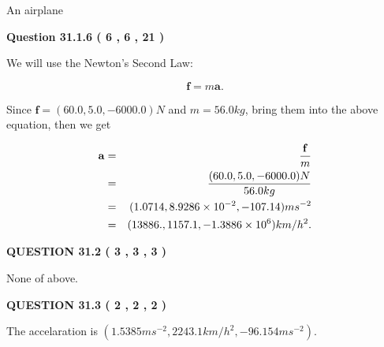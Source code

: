 \documentclass[12pt]{article}
\begin{document}
  
 
 
\noindent{}
 
 
An airplane
 
 
 
 
  
\vspace{0.2in}
  
{\textbf{\Large{Question
31.1.6 
 (           6 ,           6 ,          21 )
}}}
  
  
 
 
\noindent{}

We will use the Newton's Second Law:
 
\[
\mathbf{f}=m\mathbf{a}.
\]
 
Since $\mathbf{f}=( %
60.0,  %
5.0,  %
-6000.0 )N$
and $m= %
56.0 kg$, bring them into the above equation, then we get
 
\begin{eqnarray*}
\mathbf{a}&=&\frac{\mathbf{f}}m  \\
&=&\frac{(
60.0 ,
5.0 ,
-6000.0 )N
}{ %
56.0 kg}  \\
&=&(
1.0714 ,
8.9286 \times 10^{-2},
-107.14
)ms^{-2} \\
&=&(
13886. ,
1157.1 ,
-1.3886 \times 10^{6}
)km/h^2.
\end{eqnarray*}
 
 
 
  
\vspace{0.2in}
  
{\textbf{\Large{QUESTION
31.2 
 (           3 ,           3 ,           3 )
}}}
  
  
 
 
\noindent{}
 
 
 None of above.
 
 
 
 
  
\vspace{0.2in}
  
{\textbf{\Large{QUESTION
31.3 
 (           2 ,           2 ,           2 )
}}}
  
  
 
 
\noindent{}
 
 
The accelaration is
$(
1.5385ms^{-2},
2243.1km/h^2,
-96.154ms^{-2}
).
$
 
\end{document}
